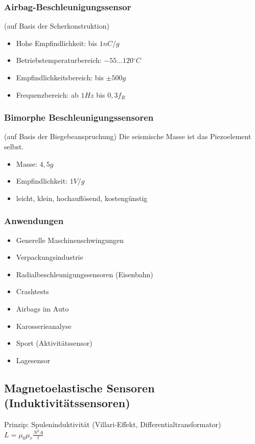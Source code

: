 \documentclass{scrreprt}
\begin{document}
\subsubsection{Airbag-Beschleunigungssensor}
(auf Basis der Scherkonstruktion)
\begin{itemize}
\item Hohe Empfindlichkeit: bis $1 \unit{nC/g}$
\item Betriebstemperaturbereich: $-55 \dots 120\unit{^\circ C}$
\item Empfindlichkeitsbereich: bis $\pm 500\unit{g}$
\item Frequenzbereich: ab $1 \unit{Hz}$ bis $0,3 f_R$
\end{itemize}
\subsubsection{Bimorphe Beschleunigungssensoren}
(auf Basis der Biegebeanspruchung) Die seismische Masse ist das Piezoelement selbst.
\begin{itemize}
\item Masse: $4,5 \unit{g}$
\item Empfindlichkeit: $1\unit{V/g}$
\item leicht, klein, hochauflösend, kostengünstig
\end{itemize}

\subsubsection{Anwendungen}
\begin{itemize}
\item Generelle Maschinenschwingungen
\item Verpackungsindustrie
\item Radialbeschleunigungssensoren (Eisenbahn)
\item Crashtests
\item Airbags im Auto
\item Karosserieanalyse
\item Sport (Aktivitätssensor)
\item Lagesensor
\end{itemize}

\subsection{Magnetoelastische Sensoren (Induktivitätssensoren)}
Prinzip: Spuleninduktivität (Villari-Effekt, Differentialtransformator)\\
$L=\mu_0 \mu_r \frac{N^2 A}{l}$
\end{document}
